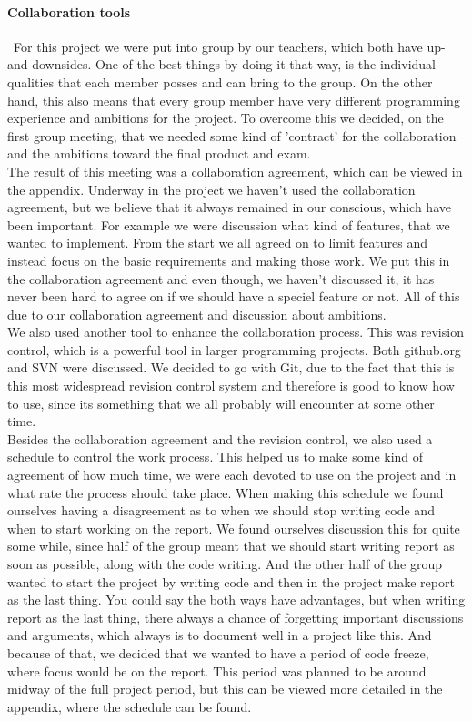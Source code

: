 \documentclass[a4paper,10pt,titlepage]{article}
\begin{document}
	\paragraph{Collaboration tools}\mbox{}\
	For this project we were put into group by our teachers, which both have up- and downsides. One of the best things by doing it that way, is the individual qualities that each member posses and can bring to the group. On the other hand, this also means that every group member have very different programming experience and ambitions for the project. To overcome this we decided, on the first group meeting, that we needed some kind of 'contract' for the collaboration and the ambitions toward the final product and exam.\\ The result of this meeting was a collaboration agreement, which can be viewed in the appendix. Underway in the project we haven't used the collaboration agreement, but we believe that it always remained in our conscious, which have been important. For example we were discussion what kind of features, that we wanted to implement. From the start we all agreed on to limit features and instead focus on the basic requirements and making those work. We put this in the collaboration agreement and even though, we haven't discussed it, it has never been hard to agree on if we should have a speciel feature or not. All of this due to our collaboration agreement and discussion about ambitions.\\
		We also used another tool to enhance the collaboration process. This was revision control, which is a powerful tool in larger programming projects. Both github.org and SVN were discussed. We decided to go with Git, due to the fact that this is this most widespread revision control system and therefore is good to know how to use, since its something that we all probably will encounter at some other time.\\
		Besides the collaboration agreement and the revision control, we also used a schedule to control the work process. This helped us to make some kind of agreement of how much time, we were each devoted to use on the project and in what rate the process should take place. When making this schedule we found ourselves having a disagreement as to when we should stop writing code and when to start working on the report. We found ourselves discussion this for quite some while, since half of the group meant that we should start writing report as soon as possible, along with the code writing. And the other half of the group wanted to start the project by writing code and then in the project make report as the last thing. You could say the both ways have advantages, but when writing report as the last thing, there always a chance of forgetting important discussions and arguments, which always is to document well in a project like this. And because of that, we decided that we wanted to have a period of code freeze, where focus would be on the report. This period was planned to be around midway of the full project period, but this can be viewed more detailed in the appendix, where the schedule can be found.\\
		
\end{document}
